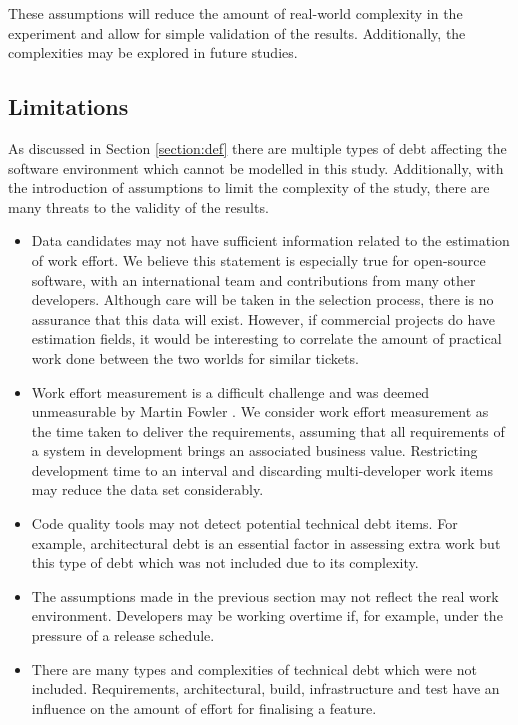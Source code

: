 \documentclass{mprop}
\begin{document}
These assumptions will reduce the amount of real-world complexity in the
experiment and allow for simple validation of the results. Additionally, the
complexities may be explored in future studies.

\subsection{Limitations}

As discussed in Section \ref{section:def} there are multiple types of debt
affecting the software environment which cannot be modelled in this study.
Additionally, with the introduction of assumptions to limit the complexity of
the study, there are many threats to the validity of the results.

\begin{itemize}
	\item Data candidates may not have sufficient information related to the
	      estimation of work effort. We believe this statement is especially
	      true for open-source software, with an international team and
	      contributions from many other developers. Although care will be taken
	      in the selection process, there is no assurance that this data will
	      exist. However, if commercial projects do have estimation fields, it
	      would be interesting to correlate the amount of practical work done
	      between the two worlds for similar tickets.
	\item Work effort measurement is a difficult challenge and was deemed
	      unmeasurable by Martin Fowler \cite{CannotMeasureProductivity}. We
	      consider work effort measurement as the time taken to deliver the
	      requirements, assuming that all requirements of a system in
	      development brings an associated business value. Restricting
	      development time to an interval and discarding multi-developer work
	      items may reduce the data set considerably.
	\item Code quality tools may not detect potential technical debt items. For
	      example, architectural debt is an essential factor in assessing extra
	      work but this type of debt which was not included due to its
	      complexity.
	\item The assumptions made in the previous section may not reflect the real
	      work environment. Developers may be working overtime if, for example, under
	      the pressure of a release schedule.
	\item There are many types and complexities of technical debt which were not
	      included. Requirements, architectural, build, infrastructure and test
	      have an influence on the amount of effort for finalising a feature.
\end{itemize}
\end{document}
